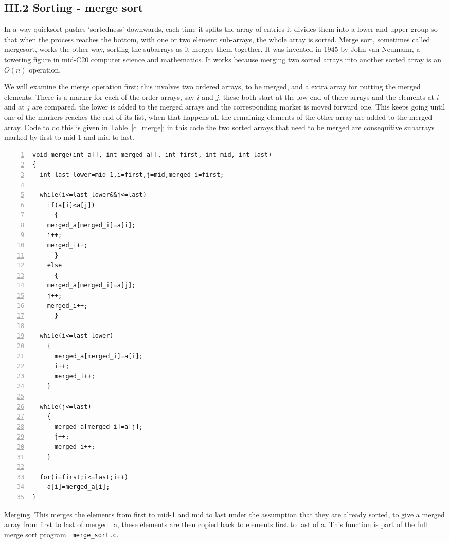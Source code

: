 \documentclass[11pt,a4paper]{scrartcl}
\begin{document}
\subsection*{III.2 Sorting - merge sort}

In a way quicksort pushes \lq{}sortedness\rq{} downwards, each time it
splits the array of entries it divides them into a lower and upper
group so that when the process reaches the bottom, with one or two
element sub-arrays, the whole array is sorted. Merge sort, sometimes
called mergesort, works the other way, sorting the subarrays as it
merges them together. It was invented in 1945 by John van Neumann, a towering
figure in mid-C20 computer science and mathematics. It works because
merging two sorted arrays into another sorted array is an $O(n)$
operation.

We will examine the merge operation first; this involves two ordered
arrays, to be merged, and a extra array for putting the merged
elements. There is a marker for each of the order arrays, say $i$ and
$j$, these both start at the low end of there arrays and the elements
at $i$ and at $j$ are compared, the lower is added to the merged
arrays and the corresponding marker is moved forward one. This keeps
going until one of the markers reaches the end of its list, when that
happens all the remaining elements of the other array are added to the
merged array. Code to do this is given in Table~\ref{c_merge}; in this
code the two sorted arrays that need to be merged are consequitive
subarrays marked by first to mid-1 and mid to last.


\begin{table}
\begin{lstlisting}[numbers=left]
void merge(int a[], int merged_a[], int first, int mid, int last)
{
  int last_lower=mid-1,i=first,j=mid,merged_i=first;

  while(i<=last_lower&&j<=last)
    if(a[i]<a[j])
      {
	merged_a[merged_i]=a[i];
	i++;
	merged_i++;
      }
    else
      {
	merged_a[merged_i]=a[j];
	j++;
	merged_i++;
      }

  while(i<=last_lower)
    {
      merged_a[merged_i]=a[i];
      i++;
      merged_i++;
    }

  while(j<=last)
    {
      merged_a[merged_i]=a[j];
      j++;
      merged_i++;
    }

  for(i=first;i<=last;i++)
    a[i]=merged_a[i];
}
\end{lstlisting}
\caption{Merging. This merges the elements from first to mid-1 and mid
  to last under the assumption that they are already sorted, to give a
  merged array from first to last of merged\_a, these elements are
  then copied back to elements first to last of a. This function is
  part of the full merge sort program {\tt
    merge\_sort.c}. \label{c_merge}}
\end{table}
\end{document}
